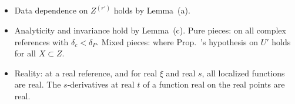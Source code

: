 \begin{detail}
\begin{step}
\begin{itemize}
\item Data dependence on $Z^{(r')}$ holds by Lemma~(a).
\item Analyticity and invariance hold by Lemma~(c). Pure pieces: on all complex references with $\delta_c<\delta_P$. Mixed pieces: where Prop.~'s hypothesis on $U'$ holds for all $X\subset Z$.
\item Reality: at a real reference, and for real $\xi$ and real $s$, all localized functions are real. The $s$-derivatives at real $t$ of a function real on the real points are real.
\end{itemize}
\end{step}
\end{detail}

